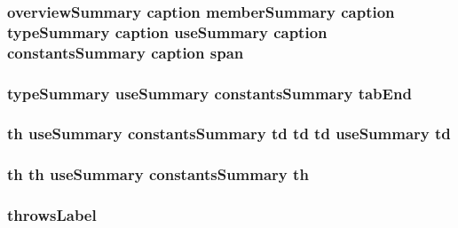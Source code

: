 \hypertarget{stylesheet_8css_a8343996ebcf16220b04e54659aac31cc}{
\subsubsection[{span}]{\setlength{\rightskip}{0pt plus 5cm}overview\-Summary {\bf caption} {\bf member\-Summary} {\bf caption} {\bf type\-Summary} {\bf caption} {\bf use\-Summary} {\bf caption} {\bf constants\-Summary} {\bf caption} span}}\label{stylesheet_8css_a8343996ebcf16220b04e54659aac31cc}
\hypertarget{stylesheet_8css_a5a2fe94a450ee1420dcbedaf1173a41d}{
\subsubsection[{tab\-End}]{ {\bf type\-Summary} {\bf use\-Summary} {\bf constants\-Summary} tab\-End}}\label{stylesheet_8css_a5a2fe94a450ee1420dcbedaf1173a41d}
\hypertarget{stylesheet_8css_a2635d454965afd759ce151c6f6d1a04a}{
\subsubsection[{td}]{ {\bf th} {\bf use\-Summary} {\bf constants\-Summary} td td td {\bf use\-Summary} td}}\label{stylesheet_8css_a2635d454965afd759ce151c6f6d1a04a}
\hypertarget{stylesheet_8css_a0910f46cbaedf1a50e2b4337fde699db}{
\subsubsection[{th}]{\setlength{\rightskip}{0pt plus 5cm}th th {\bf use\-Summary} {\bf constants\-Summary} th}}\label{stylesheet_8css_a0910f46cbaedf1a50e2b4337fde699db}
\hypertarget{stylesheet_8css_a8880523f452895f95bdd7392bcbcd730}{
\subsubsection[{throws\-Label}]{\setlength{\rightskip}{0pt plus 5cm}throws\-Label}}\label{stylesheet_8css_a8880523f452895f95bdd7392bcbcd730}
